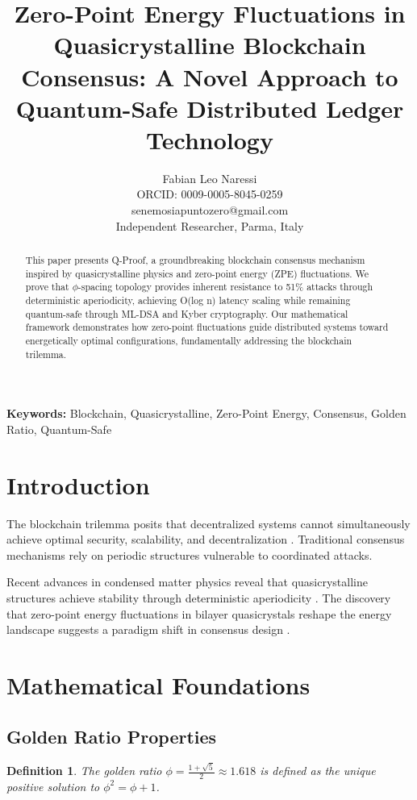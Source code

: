 \documentclass[12pt]{article}
\title{Zero-Point Energy Fluctuations in Quasicrystalline Blockchain Consensus: A Novel Approach to Quantum-Safe Distributed Ledger Technology}
\author{Fabian Leo Naressi\\
ORCID: 0009-0005-8045-0259\\
senemosiapuntozero@gmail.com\\
Independent Researcher, Parma, Italy}
\newtheorem lemma}[theorem]{Lemma}
\newtheorem{definition}{Definition}
\begin{document}
\maketitle

\begin{abstract}
This paper presents Q-Proof, a groundbreaking blockchain consensus mechanism inspired by quasicrystalline physics and zero-point energy (ZPE) fluctuations. We prove that $\phi$-spacing topology provides inherent resistance to 51\% attacks through deterministic aperiodicity, achieving O(log n) latency scaling while remaining quantum-safe through ML-DSA and Kyber cryptography. Our mathematical framework demonstrates how zero-point fluctuations guide distributed systems toward energetically optimal configurations, fundamentally addressing the blockchain trilemma.
\end{abstract}

\textbf{Keywords:} Blockchain, Quasicrystalline, Zero-Point Energy, Consensus, Golden Ratio, Quantum-Safe

\section{Introduction}

The blockchain trilemma posits that decentralized systems cannot simultaneously achieve optimal security, scalability, and decentralization \cite{nakamoto}. Traditional consensus mechanisms rely on periodic structures vulnerable to coordinated attacks.

Recent advances in condensed matter physics reveal that quasicrystalline structures achieve stability through deterministic aperiodicity \cite{shechtman}. The discovery that zero-point energy fluctuations in bilayer quasicrystals reshape the energy landscape suggests a paradigm shift in consensus design \cite{zhang2024}.

\section{Mathematical Foundations}

\subsection{Golden Ratio Properties}

\begin{definition}
The golden ratio $\phi = \frac{1+\sqrt{5}}{2} \approx 1.618$ is defined as the unique positive solution to $\phi^2 = \phi + 1$.
\end{definition}
\end{document}
